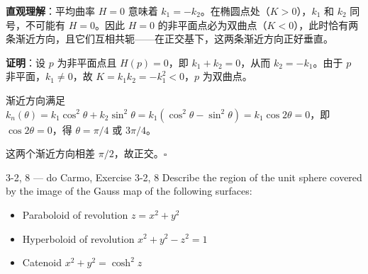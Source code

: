 \begin{solution}
\textbf{直观理解}：平均曲率 $H = 0$ 意味着 $k_1 = -k_2$。在椭圆点处（$K > 0$），$k_1$ 和 $k_2$ 同号，不可能有 $H = 0$。因此 $H = 0$ 的非平面点必为双曲点（$K < 0$），此时恰有两条渐近方向，且它们互相共轭——在正交基下，这两条渐近方向正好垂直。

\textbf{证明}：设 $p$ 为非平面点且 $H(p) = 0$，即 $k_1 + k_2 = 0$，从而 $k_2 = -k_1$。由于 $p$ 非平面，$k_1 \neq 0$，故 $K = k_1 k_2 = -k_1^2 < 0$，$p$ 为双曲点。

渐近方向满足 $k_n(\theta) = k_1 \cos^2\theta + k_2 \sin^2\theta = k_1(\cos^2\theta - \sin^2\theta) = k_1 \cos 2\theta = 0$，即 $\cos 2\theta = 0$，得 $\theta = \pi/4$ 或 $3\pi/4$。

这两个渐近方向相差 $\pi/2$，故正交。$\square$
\end{solution}

\begin{exercise}{3-2, 8 — do Carmo, Exercise 3-2, 8}
Describe the region of the unit sphere covered by the image of the Gauss map of the following surfaces:
\begin{itemize}
\item[a.] Paraboloid of revolution $z = x^{2} + y^{2}$
\item[b.] Hyperboloid of revolution $x^{2} + y^{2} - z^{2} = 1$
\item[c.] Catenoid $x^{2} + y^{2} = \cosh^{2}z$
\end{itemize}
\end{exercise}

